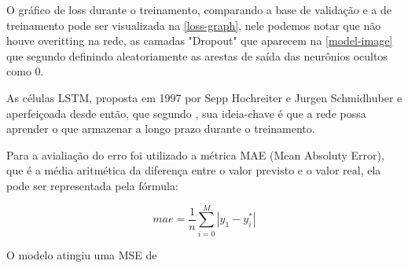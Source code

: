 \documentclass[
	article,			%
	11pt,				%
	oneside,			%
	a4paper,			%
	english,			%
	brazil,				%
	sumario=tradicional
	]{abntex2}
\begin{document}
O gráfico de loss durante o treinamento, comparando a base de validação e a de treinamento pode ser visualizada na \autoref{loss-graph}, nele podemos notar que não houve overitting na rede, as camadas "Dropout" que aparecem na \autoref{model-image} que segundo  definindo aleatoriamente as arestas de saída das neurônios ocultos como 0.

As células LSTM, proposta em 1997 por Sepp Hochreiter e Jurgen Schmidhuber e aperfeiçoada desde então, que segundo , sua ideia-chave é que a rede possa aprender o que armazenar a longo prazo durante o treinamento.

Para a avialiação do erro foi utilizado a métrica MAE (Mean Absoluty Error), que é a média aritmética da diferença entre o valor previsto e o valor real, ela pode ser representada pela fórmula:

\begin{equation}
mae = \frac{1}{n}\sum_{i=0}^M |{y_1 - y^*_i}|
\end{equation}

O modelo atingiu uma MSE de 

\postextual



%
%

\end{document}
